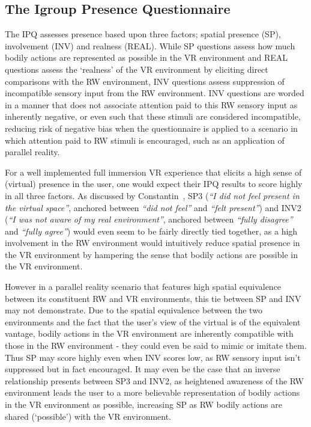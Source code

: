 \subsection{The Igroup Presence Questionnaire}
\label{igroup-presence-questionnaire-explanation}
The IPQ assesses presence based upon three factors; spatial presence (SP), involvement (INV) and realness (REAL). While SP questions assess how much bodily actions are represented as possible in the VR environment and REAL questions assess the `realness' of the VR environment by eliciting direct comparisons with the RW environment, INV questions assess suppression of incompatible sensory input from the RW environment. INV questions are worded in a manner that does not associate attention paid to this RW sensory input as inherently negative, or even such that these stimuli are considered incompatible, reducing risk of negative bias when the questionnaire is applied to a scenario in which attention paid to RW stimuli is encouraged, such as an application of parallel reality.

For a well implemented full immersion VR experience that elicits a high sense of (virtual) presence in the user, one would expect their IPQ results to score highly in all three factors. As discussed by Constantin~\cite{Constantin2003}, SP3 (\textit{``I did not feel present in the virtual space''}, anchored between \textit{``did not feel''} and \textit{``felt present''}) and INV2 (\textit{``I was not aware of my real environment''}, anchored between \textit{``fully disagree''} and \textit{``fully agree''}) would even seem to be fairly directly tied together, as a high involvement in the RW environment would intuitively reduce spatial presence in the VR environment by hampering the sense that bodily actions are possible in the VR environment.

However in a parallel reality scenario that features high spatial equivalence between its constituent RW and VR environments, this tie between SP and INV may not demonstrate. Due to the spatial equivalence between the two environments and the fact that the user's view of the virtual is of the equivalent vantage, bodily actions in the VR environment are inherently compatible with those in the RW environment - they could even be said to mimic or imitate them. Thus SP may score highly even when INV scores low, as RW sensory input isn't suppressed but in fact encouraged. It may even be the case that an inverse relationship presents between SP3 and INV2, as heightened awareness of the RW environment leads the user to a more believable representation of bodily actions in the VR environment as possible, increasing SP as RW bodily actions are shared (`possible') with the VR environment.

